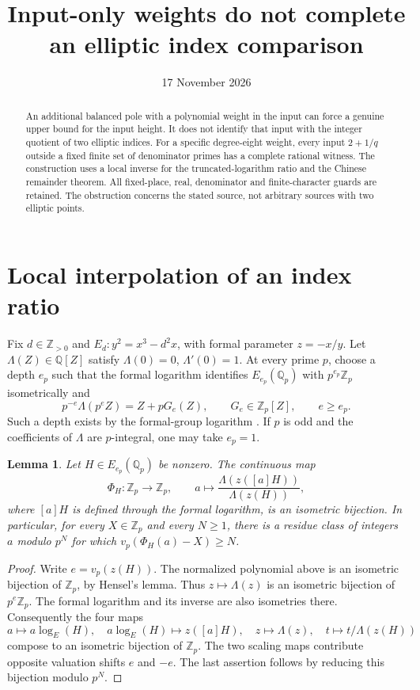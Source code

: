 \documentclass[11pt,a4paper]{article}
\title{Input-only weights do not complete an elliptic index comparison}
\author{}\date{17 November 2026}
\newtheorem{lemma}[theorem]{Lemma}
\newcommand{\Q}{\mathbb Q}\newcommand{\Z}{\mathbb Z}
\begin{document}
\maketitle

\begin{abstract}
An additional balanced pole with a polynomial weight in the input
can force a genuine upper bound for the input height. It does not
identify that input with the integer quotient of two elliptic
indices. For a specific degree-eight weight, every input $2+1/q$
outside a fixed finite set of denominator primes has a complete
rational witness. The construction uses a local inverse for the
truncated-logarithm ratio and the Chinese remainder theorem.
All fixed-place, real, denominator and finite-character guards are
retained. The obstruction concerns the stated source, not arbitrary
sources with two elliptic points.
\end{abstract}

\section{Local interpolation of an index ratio}

Fix $d\in\Z_{>0}$ and $E_d:y^2=x^3-d^2x$, with formal
parameter $z=-x/y$. Let $\Lambda(Z)\in\Q[Z]$ satisfy
$\Lambda(0)=0$, $\Lambda'(0)=1$. At every prime $p$, choose a
depth $e_p$ such that the formal logarithm identifies
$E_{e_p}(\Q_p)$ with $p^{e_p}\Z_p$ isometrically and
\[
 p^{-e}\Lambda(p^e Z)=Z+pG_e(Z),\qquad G_e\in\Z_p[Z],
                         \qquad e\ge e_p.
\]
Such a depth exists by the formal-group logarithm
\cite[Chapters IV and VII]{AEC}. If $p$ is odd and the coefficients of
$\Lambda$ are $p$-integral, one may take $e_p=1$.

\begin{lemma}\label{lem:interpolation}
Let $H\in E_{e_p}(\Q_p)$ be nonzero. The continuous map
\[
 \Phi_H:\Z_p\longrightarrow\Z_p,\qquad
 a\longmapsto\frac{\Lambda(z([a]H))}{\Lambda(z(H))},
\]
where $[a]H$ is defined through the formal logarithm, is an
isometric bijection. In particular, for every $X\in\Z_p$ and
every $N\ge1$, there is a residue class of integers $a$ modulo
$p^N$ for which $v_p(\Phi_H(a)-X)\ge N$.
\end{lemma}
\begin{proof}
Write $e=v_p(z(H))$. The normalized polynomial above is an
isometric bijection of $\Z_p$, by Hensel's lemma. Thus
$z\mapsto\Lambda(z)$ is an isometric bijection of
$p^e\Z_p$. The formal logarithm and its inverse are also
isometries there. Consequently the four maps
\[
 a\mapsto a\log_E(H),\quad
 a\log_E(H)\mapsto z([a]H),\quad
 z\mapsto\Lambda(z),\quad
 t\mapsto t/\Lambda(z(H))
\]
compose to an isometric bijection of $\Z_p$. The two scaling
maps contribute opposite valuation shifts $e$ and $-e$.
The last assertion follows by reducing this bijection modulo
$p^N$.
\end{proof}
\end{document}
